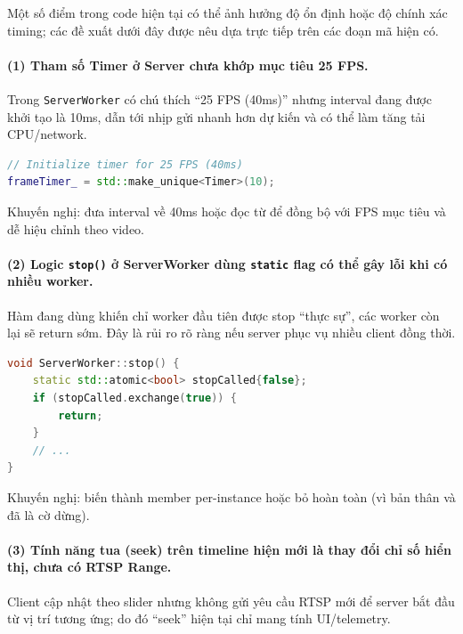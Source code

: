 Một số điểm trong code hiện tại có thể ảnh hưởng độ ổn định hoặc độ chính xác timing; các đề xuất dưới đây được nêu dựa trực tiếp trên các đoạn mã hiện có.

\paragraph{(1) Tham số Timer ở Server chưa khớp mục tiêu 25 FPS.}
Trong \texttt{ServerWorker} có chú thích ``25 FPS (40ms)'' nhưng interval đang được khởi tạo là 10ms, dẫn tới nhịp gửi nhanh hơn dự kiến và có thể làm tăng tải CPU/network.

\begin{lstlisting}[language=C++, caption={Interval Timer ở ServerWorker đang đặt 10ms dù comment nói 40ms}, label={lst:timer_mismatch}]
// Initialize timer for 25 FPS (40ms)
frameTimer_ = std::make_unique<Timer>(10);
\end{lstlisting}

Khuyến nghị: đưa interval về 40ms hoặc đọc từ  để đồng bộ với FPS mục tiêu và dễ hiệu chỉnh theo video.

\paragraph{(2) Logic \texttt{stop()} ở ServerWorker dùng \texttt{static} flag có thể gây lỗi khi có nhiều worker.}
Hàm  đang dùng  khiến chỉ worker đầu tiên được stop ``thực sự'', các worker còn lại sẽ return sớm. Đây là rủi ro rõ ràng nếu server phục vụ nhiều client đồng thời.

\begin{lstlisting}[language=C++, caption={Static stop flag có thể làm dừng sai khi nhiều worker}, label={lst:stop_static_bug}]
void ServerWorker::stop() {
    static std::atomic<bool> stopCalled{false};
    if (stopCalled.exchange(true)) {
        return;
    }
    // ...
}
\end{lstlisting}

Khuyến nghị: biến  thành member per-instance hoặc bỏ hoàn toàn (vì bản thân  và  đã là cờ dừng).

\paragraph{(3) Tính năng tua (seek) trên timeline hiện mới là thay đổi chỉ số hiển thị, chưa có RTSP Range.}
Client cập nhật  theo slider nhưng không gửi yêu cầu RTSP mới để server bắt đầu từ vị trí tương ứng; do đó ``seek'' hiện tại chỉ mang tính UI/telemetry.

